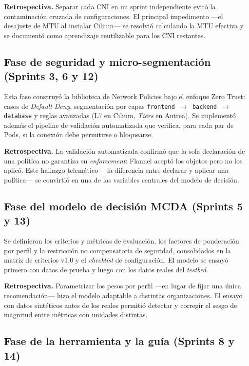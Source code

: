 \textbf{Retrospectiva.} Separar cada CNI en un sprint independiente evitó la contaminación cruzada de configuraciones. El principal impedimento ---el desajuste de MTU al instalar Cilium--- se resolvió calculando la MTU efectiva y se documentó como aprendizaje reutilizable para los CNI restantes.

\subsection{Fase de seguridad y micro-segmentación (Sprints 3, 6 y 12)}

Esta fase construyó la biblioteca de Network Policies bajo el enfoque Zero Trust: casos de \emph{Default Deny}, segmentación por capas \texttt{frontend $\rightarrow$ backend $\rightarrow$ database} y reglas avanzadas (L7 en Cilium, \emph{Tiers} en Antrea). Se implementó además el pipeline de validación automatizada que verifica, para cada par de Pods, si la conexión debe permitirse o bloquearse.

\textbf{Retrospectiva.} La validación automatizada confirmó que la sola declaración de una política no garantiza su \emph{enforcement}: Flannel aceptó los objetos pero no los aplicó. Este hallazgo telemático ---la diferencia entre declarar y aplicar una política--- se convirtió en una de las variables centrales del modelo de decisión.

\subsection{Fase del modelo de decisión MCDA (Sprints 5 y 13)}

Se definieron los criterios y métricas de evaluación, los factores de ponderación por perfil y la restricción no compensatoria de seguridad, consolidados en la matriz de criterios v1.0 y el \emph{checklist} de configuración. El modelo se ensayó primero con datos de prueba y luego con los datos reales del \emph{testbed}.

\textbf{Retrospectiva.} Parametrizar los pesos por perfil ---en lugar de fijar una única recomendación--- hizo el modelo adaptable a distintas organizaciones. El ensayo con datos sintéticos antes de los reales permitió detectar y corregir el sesgo de magnitud entre métricas con unidades distintas.

\subsection{Fase de la herramienta y la guía (Sprints 8 y 14)}

